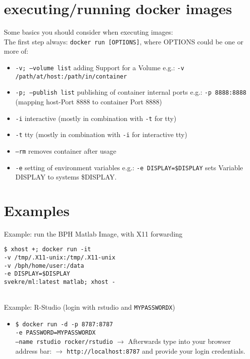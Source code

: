 \documentclass[]{scrartcl}
\begin{document}
\section{executing/running docker images}
\begin{mybox}
	Some basics you should consider when executing images: \\
	The first step always: \texttt{docker run [OPTIONS]}, where OPTIONS could be one or more of:
	\begin{itemize}
		\item \texttt{-v; --volume list} adding Support for a Volume 
		\subitem e.g.: \texttt{-v /path/at/host:/path/in/container}
		\item \texttt{-p; --publish list} publishing of container internal ports
		\subitem e.g.: \texttt{-p 8888:8888} (mapping host-Port 8888 to container Port 8888)
		\item \texttt{-i} interactive (mostly in combination with \texttt{-t} for tty)
		\item \texttt{-t} tty (mostly in combination with \texttt{-i} for interactive tty)
		\item \texttt{--rm} removes container after usage
		\item \texttt{-e} setting of environment variables
		\subitem e.g.: \texttt{-e DISPLAY=\$DISPLAY}  
		\subitem sets Variable DISPLAY to systems \$DISPLAY. 
	\end{itemize}
\end{mybox}

\section{Examples}
\noindent
Example: run the BPH Matlab Image, with X11 forwarding
\begin{mybox}
	\texttt{\$ xhost +; docker run -it \\
		-v /tmp/.X11-unix:/tmp/.X11-unix \\
		-v /bph/home/user:/data \\
		-e DISPLAY=\$DISPLAY \\
		svekre/ml:latest matlab; xhost -}
\end{mybox}
\\
\noindent
Example: R-Studio (login with rstudio and \texttt{MYPASSWORDX})
\begin{mybox}
	\begin{itemize}
		\item 	\texttt{\$ docker run -d -p 8787:8787 \\
			-e PASSWORD=MYPASSWORDX \\
			--name rstudio rocker/rstudio}
	    \subitem \(\rightarrow\) Afterwards type into your browser address bar: 
	    \subitem  \(\rightarrow\) \texttt{http://localhost:8787} and provide your login credentials.
	\end{itemize}
\end{mybox}
\end{document}
